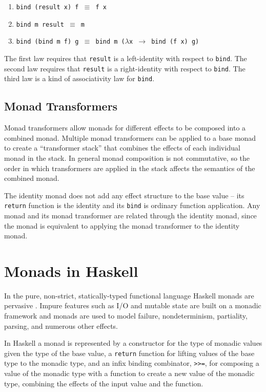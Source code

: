 \documentclass[natbib,10pt]{sigplanconf}
\begin{document}
\begin{enumerate}
\item \texttt{bind (result x) f $\equiv$ f x}
\item \texttt{bind m result $\equiv$ m}
\item \texttt{bind (bind m f) g $\equiv$ bind m ($\lambda$x $\rightarrow$ bind (f x) g)}
\end{enumerate}

The first law requires that \texttt{result} is a left-identity with
respect to \texttt{bind}. The second law requires that \texttt{result} is a
right-identity with respect to \texttt{bind}. The third law is a kind of
associativity law for \texttt{bind}.

\subsection{Monad Transformers}

Monad transformers allow monads for different effects to be composed
into a combined monad.  Multiple monad transformers can be applied to
a base monad to create a ``transformer stack'' that combines the
effects of each individual monad in the stack.  In general monad
composition is not commutative, so the order in which transformers are
applied in the stack affects the semantics of the combined monad.

The identity monad does not add any effect structure to the base value
-- its \texttt{return} function is the identity and its \texttt{bind} is
ordinary function application.  Any monad and its monad transformer
are related through the identity monad, since the monad is equivalent
to applying the monad transformer to the identity monad.

\section{Monads in Haskell}

\newcommand{\hbind}[0]{\texttt{>>=}}

In the pure, non-strict, statically-typed functional language Haskell
monads are pervasive \citep{awkward-squad,haskell98}.  Impure features
such as I/O and mutable state are built on a monadic framework and
monads are used to model failure, nondeterminism, partiality, parsing,
and numerous other effects.

In Haskell a monad is represented by a constructor for the type of
monadic values given the type of the base value, a {\tt return}
function for lifting values of the base type to the monadic type, and
an infix binding combinator, \hbind, for composing a value of the
monadic type with a function to create a new value of the monadic
type, combining the effects of the input value and the function.
\end{document}
